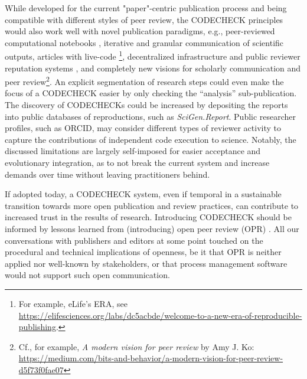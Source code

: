 \documentclass[12pt]{article}
\begin{document}
While developed for the current "paper"-centric publication process and
being compatible with different styles of peer review, the CODECHECK 
principles would also work well with novel publication paradigms, e.g.,
peer-reviewed computational notebooks \cite{earthcube_new_2020},
iterative and granular communication of scientific outputs, 
articles with live-code \cite{perkel_pioneering_2019-1}
\footnote{For example, eLife's ERA, see 
\url{https://elifesciences.org/labs/dc5acbde/welcome-to-a-new-era-of-reproducible-publishing}.},
decentralized infrastructure and public reviewer reputation systems
\cite{tenorio-fornes_towards_2019},
and completely new visions for scholarly communication and peer 
review\footnote{Cf., for example, \emph{A modern vision for peer review} by 
Amy J. Ko: \url{https://medium.com/bits-and-behavior/a-modern-vision-for-peer-review-d5f73f0fae07}}.
An explicit segmentation of research steps could even make the focus 
of a CODECHECK easier by only checking the ``analysis'' sub-publication.
The discovery of CODECHECKs could be increased by depositing the reports
into public databases of reproductions, such as \emph{SciGen.Report}.
Public researcher profiles, such as ORCID, may consider different
types of reviewer activity to capture the contributions of independent 
code execution to science.
Notably, the discussed limitations are largely self-imposed for easier
acceptance and evolutionary integration, as to not break the current 
system and increase demands over time without leaving practitioners behind. 

If adopted today, a CODECHECK system, even if temporal in a sustainable 
transition towards more open publication and review practices, can contribute
to increased trust in the results of research. Introducing CODECHECK
should be informed by lessons learned from (introducing) open peer review
(OPR) \cite{ross-hellauer_guidelines_2019}.
All our conversations with publishers and editors at some point
touched on the procedural and technical implications of openness, be it 
that OPR is neither applied nor well-known by stakeholders, or that process
management software would not support such open communication.
\end{document}
